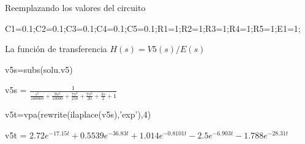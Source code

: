 \documentclass[10pt,a4paper]{article} %
\begin{document}
	
	\begin{par}
	\begin{flushleft}
	Reemplazando los valores del circuito
	\end{flushleft}
	\end{par}
	
	\begin{matlabcode}
	C1=0.1;C2=0.1;C3=0.1;C4=0.1;C5=0.1;R1=1;R2=1;R3=1;R4=1;R5=1;E1=1;
	\end{matlabcode}
	
	\begin{par}
	\begin{flushleft}
	La función de transferencia $ H(s)=V5(s)/E(s)$
	\end{flushleft}
	\end{par}
	
	\begin{matlabcode}
	v5s=subs(solu.v5)
	\end{matlabcode}
	\begin{matlabsymbolicoutput}
	v5s = 
	$\displaystyle \frac{1}{\frac{s^5 }{100000}+\frac{9 s^4 }{10000}+\frac{7 s^3 }{250}+\frac{7 s^2 }{20}+\frac{3 s}{2}+1}$
	\end{matlabsymbolicoutput}
	\begin{matlabcode}
	v5t=vpa(rewrite(ilaplace(v5s),'exp'),4)
	\end{matlabcode}
	\begin{matlabsymbolicoutput}
	v5t = 
	$\displaystyle 2.72 e^{-17.15 t} +0.5539 e^{-36.83 t} +1.014 e^{-0.8101 t} -2.5 e^{-6.903 t} -1.788 e^{-28.31 t} $
	\end{matlabsymbolicoutput}
	
	
	
\end{document}

